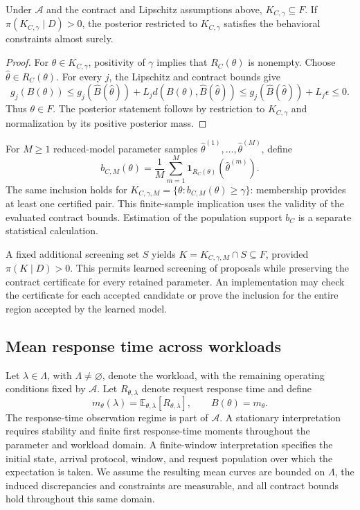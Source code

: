 \begin{proposition}
Under $\mathcal A$ and the contract and Lipschitz assumptions above,
$K_{C,\gamma}\subseteq F$. If $\pi(K_{C,\gamma}\mid D)>0$, the posterior
restricted to $K_{C,\gamma}$ satisfies the behavioral constraints almost
surely.
\end{proposition}
\begin{proof}
For $\theta\in K_{C,\gamma}$, positivity of $\gamma$ implies that
$R_C(\theta)$ is nonempty. Choose $\hat\theta\in R_C(\theta)$. For every
$j$, the Lipschitz and contract bounds give
\[
 g_j(B(\theta))
 \leq g_j(\widehat B(\hat\theta))
       +L_j d(B(\theta),\widehat B(\hat\theta))
 \leq g_j(\widehat B(\hat\theta))+L_j\epsilon\leq0.
\]
Thus $\theta\in F$. The posterior statement follows by restriction to
$K_{C,\gamma}$ and normalization by its positive posterior mass.
\end{proof}

For $M\geq1$ reduced-model parameter samples $\hat\theta^{(1)},\ldots,
\hat\theta^{(M)}$, define
\[
 b_{C,M}(\theta)=\frac1M\sum_{m=1}^M
       \mathbf1_{R_C(\theta)}(\hat\theta^{(m)}).
\]
The same inclusion holds for
$K_{C,\gamma,M}=\{\theta:b_{C,M}(\theta)\geq\gamma\}$: membership
provides at least one certified pair. This finite-sample implication uses
the validity of the evaluated contract bounds. Estimation of the population
support $b_C$ is a separate statistical calculation.

A fixed additional screening set $S$ yields
$K=K_{C,\gamma,M}\cap S\subseteq F$, provided $\pi(K\mid D)>0$.
This permits learned screening of proposals while preserving the contract
certificate for every retained parameter. An implementation may check the
certificate for each accepted candidate or prove the inclusion for the
entire region accepted by the learned model.

\subsection{Mean response time across workloads}

Let $\lambda\in\Lambda$, with $\Lambda\ne\varnothing$, denote the workload, with the remaining operating
conditions fixed by $\mathcal A$. Let $R_{\theta,\lambda}$ denote request
response time and define
\[
 m_\theta(\lambda)=\mathbb E_{\theta,\lambda}[R_{\theta,\lambda}],
 \qquad B(\theta)=m_\theta.
\]
The response-time observation regime is part of $\mathcal A$. A stationary
interpretation requires stability and finite first response-time moments
throughout the parameter and workload domain. A finite-window
interpretation specifies the initial state, arrival protocol, window, and
request population over which the expectation is taken. We assume the
resulting mean curves are bounded on $\Lambda$, the induced discrepancies
and constraints are measurable, and all contract bounds hold throughout
this same domain.

